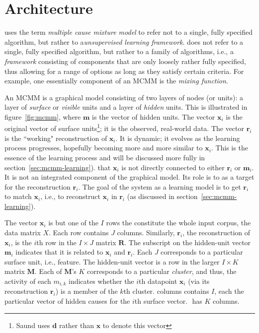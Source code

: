 \section{Architecture}
\label{sec:architecture}
\citet{saund:94} uses the term \emph{multiple cause mixture model} to refer not to a single, fully specified algorithm, but rather to a\emph{unsupervised learning framework}.
does not refer to a single, fully specified algorithm, but rather to a family of algorithms, 
i.e., a \emph{framework} consisting of components that are only loosely rather fully 
specified, thus allowing for a range of options as long as they satisfy certain criteria. 
For example, one essentially component of an MCMM is the \emph{mixing function}.

An MCMM is a graphical model consisting of two layers of nodes (or units): a layer 
of \emph{surface} or \emph{visible} units 
and a layer of \emph{hidden} units. 
This is illustrated in figure~\ref{fig:mcmm}, where $\mathbf{m}$ 
is the vector of hidden units. The vector $\mathbf{x}_i$ is the 
original vector of surface units\footnote{Saund uses $\mathbf{d}$ 
rather than $\mathbf{x}$ to denote this vector}; it is the observed, 
real-world data. The vector $\mathbf{r}_i$ is the ``working" 
reconstruction of $\mathbf{x}_i$. It is dynamic; 
it evolves as the learning process progresses, hopefully 
becoming more and more similar to $\mathbf{x}_i$. 
This is the essence of the learning process and will be 
discussed more fully in section~\ref{sec:mcmm-learning}).
that $\mathbf{x}_i$ is not directly connected to either $\mathbf{r}_i$ 
or $\mathbf{m}_i$. It is not an integrated component of the graphical 
model. Its role is to as a target for the reconstruction $\mathbf{r}_i$. 
The goal of the system as a learning model is to get $\mathbf{r}_i$ to 
match $\mathbf{x}_i$, i.e., to reconstruct $\mathbf{x}_i$ in 
$\mathbf{r}_i$ (as discussed in section~\ref{sec:mcmm-learning}).

The vector $\mathbf{x}_i$ is but one of the $I$ rows the constitute the whole 
input corpus, the data matrix $X$. Each row contains $J$ columns. Similarly, 
$\mathbf{r}_i$, the reconstruction of $\mathbf{x}_i$, is the $i$th row in the 
$I \times J$ matrix $\mathbf{R}$. The subscript on the hidden-unit vector 
$\mathbf{m}_i$ indicates that it is related to $\mathbf{x}_i$ and $\mathbf{r}_i$. 
Each $J$ corresponds to a particular surface unit, i.e., feature. 
The hidden-unit vector is a row in the larger $I \times K$ matrix 
$\mathbf{M}$. Each of $\mathbf{M}$'s $K$ corresponds to a particular 
\emph{cluster}, and thus, the activity of each $m_{i,k}$ indicates whether the $i$th 
datapoint $\mathbf{x}_i$ (via its reconstruction $\mathbf{r}_i$) is a member of the 
$k$th cluster.  columns contains $I$, each the particular vector of hidden causes for 
the $i$th surface vector. $\mathbf{}$ has $K$ columns.

